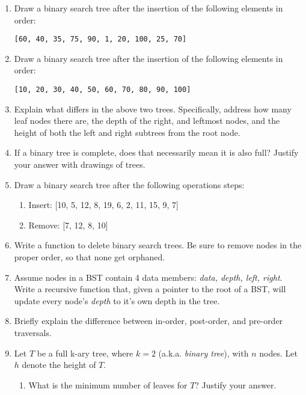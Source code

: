 \documentclass[11pt]{article}
\begin{document}
    \begin{enumerate}
        \item Draw a binary search tree after the insertion of the following elements in order: 
        
        \verb|[60, 40, 35, 75, 90, 1, 20, 100, 25, 70]|
        
        \item Draw a binary search tree after the insertion of the following elements in order: 
        
        \verb|[10, 20, 30, 40, 50, 60, 70, 80, 90, 100]|
        
        \item Explain what differs in the above two trees. Specifically, address how many leaf nodes there are, the depth of the right, and leftmost nodes, and the height of both the left and right subtrees from the root node. 
        
        \item If a binary tree is complete, does that necessarily mean it is also full? Justify your answer with drawings of trees.
        
        \item Draw a binary search tree after the following operations steps:
    \begin{enumerate}
        
        \item Insert: [10, 5, 12, 8, 19, 6, 2, 11, 15, 9, 7]
        
        \item Remove: [7, 12, 8, 10]
    \end{enumerate}
    \item Write a function to delete binary search trees. Be sure to remove nodes in the proper order, so that none get orphaned.

    \item Assume nodes in a BST contain 4 data members: {\it data, depth, left, right}.  Write a recursive function that, given a pointer to the root of a BST, will update every node's {\it depth} to it's own depth in the tree.

    \item Briefly explain the difference between in-order, post-order, and pre-order traversals.

    \item Let $T$ be a full k-ary tree, where $k=2$ (a.k.a. {\it binary tree}), with $n$ nodes.  Let $h$ denote the height of $T$.
    \begin{enumerate}
        \item What is the minimum number of leaves for $T$?  Justify your answer.


\end{enumerate}
\end{enumerate}
\end{document}
